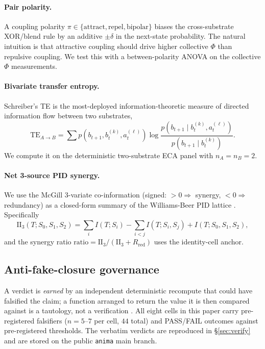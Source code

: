 \documentclass[11pt,a4paper]{article}
\begin{document}
\paragraph{Pair polarity.}
A coupling polarity $\pi \in \{\text{attract}, \text{repel}, \text{bipolar}\}$
biases the cross-substrate XOR/blend rule by an additive
$\pm \delta$ in the next-state probability. The natural intuition
is that attractive coupling should drive higher collective $\Phi$
than repulsive coupling. We test this with a between-polarity ANOVA
on the collective $\Phi$ measurements.

\paragraph{Bivariate transfer entropy.}
Schreiber's TE \citep{schreiber2000te} is the most-deployed
information-theoretic measure of directed information flow between
two substrates,
\[
  \mathrm{TE}_{A \to B} =
  \sum p(b_{t+1}, b_t^{(k)}, a_t^{(\ell)}) \log
  \frac{p(b_{t+1} \mid b_t^{(k)}, a_t^{(\ell)})}{p(b_{t+1} \mid b_t^{(k)})}.
\]
We compute it on the deterministic two-substrate ECA panel with
$n_A = n_B = 2$.

\paragraph{Net 3-source PID synergy.}
We use the McGill 3-variate co-information
\citep{mcgill1954multivariate} (signed: $> 0 \Rightarrow$ synergy,
$< 0 \Rightarrow$ redundancy) as a closed-form summary of the
Williams-Beer PID lattice \citep{williams2010pid,bertschinger2014synergistic}.
Specifically
\[
  \mathrm{II}_3(T; S_0, S_1, S_2)
  = \sum_i I(T; S_i) - \sum_{i<j} I(T; S_i, S_j)
    + I(T; S_0, S_1, S_2),
\]
and the synergy ratio $\mathrm{ratio} =
\mathrm{II}_3 / (\mathrm{II}_3 + R_{\mathrm{red}})$ uses the
identity-cell anchor.

\subsection{Anti-fake-closure governance}
\label{sec:antifake}

A verdict is \emph{earned} by an independent deterministic recompute
that could have falsified the claim; a function arranged to return
the value it is then compared against is a tautology, not a
verification \citep{anima_g73}. All eight cells in this paper carry
pre-registered falsifiers ($n=5$--$7$ per cell, $44$ total) and
PASS/FAIL outcomes against pre-registered thresholds. The verbatim
verdicts are reproduced in \S\ref{sec:verify} and are stored on
the public \texttt{anima} main branch.
\end{document}
